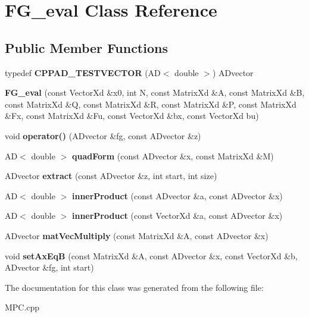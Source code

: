 \hypertarget{classFG__eval}{}\section{F\+G\+\_\+eval Class Reference}
\label{classFG__eval}
\subsection*{Public Member Functions}
\begin{DoxyCompactItemize}
\item 
\mbox{\label{classFG__eval_aa996df77a971dedd5d5715ef6be1258e}} 
typedef {\bfseries C\+P\+P\+A\+D\+\_\+\+T\+E\+S\+T\+V\+E\+C\+T\+OR} (AD$<$ double $>$) A\+Dvector
\item 
\mbox{\label{classFG__eval_a21207506da5c8dd16a9cde39c899fdac}} 
{\bfseries F\+G\+\_\+eval} (const Vector\+Xd \&x0, int N, const Matrix\+Xd \&A, const Matrix\+Xd \&B, const Matrix\+Xd \&Q, const Matrix\+Xd \&R, const Matrix\+Xd \&P, const Matrix\+Xd \&Fx, const Matrix\+Xd \&Fu, const Vector\+Xd \&bx, const Vector\+Xd bu)
\item 
\mbox{\label{classFG__eval_a43a1e90f9d5b9729c3c3f2d4b83c2abe}} 
void {\bfseries operator()} (A\+Dvector \&fg, const A\+Dvector \&z)
\item 
\mbox{\label{classFG__eval_a80dd9281eb5fec75b488b8d19439c836}} 
AD$<$ double $>$ {\bfseries quad\+Form} (const A\+Dvector \&x, const Matrix\+Xd \&M)
\item 
\mbox{\label{classFG__eval_a5ee812f6d393850b3f8c702b60c35ad7}} 
A\+Dvector {\bfseries extract} (const A\+Dvector \&z, int start, int size)
\item 
\mbox{\label{classFG__eval_a3938a02d039cc343f88a444d13289cc1}} 
AD$<$ double $>$ {\bfseries inner\+Product} (const A\+Dvector \&a, const A\+Dvector \&x)
\item 
\mbox{\label{classFG__eval_a8d198d976aba16c940570fff2ac1ade6}} 
AD$<$ double $>$ {\bfseries inner\+Product} (const Vector\+Xd \&a, const A\+Dvector \&x)
\item 
\mbox{\label{classFG__eval_a20f32730fd659427de307cf9fe9fe940}} 
A\+Dvector {\bfseries mat\+Vec\+Multiply} (const Matrix\+Xd \&A, const A\+Dvector \&x)
\item 
\mbox{\label{classFG__eval_a32e59236a0889df4239e43034ad1bbf1}} 
void {\bfseries set\+Ax\+EqB} (const Matrix\+Xd \&A, const A\+Dvector \&x, const Vector\+Xd \&b, A\+Dvector \&fg, int start)
\end{DoxyCompactItemize}


The documentation for this class was generated from the following file\+:\begin{DoxyCompactItemize}
\item 
M\+P\+C.\+cpp\end{DoxyCompactItemize}
